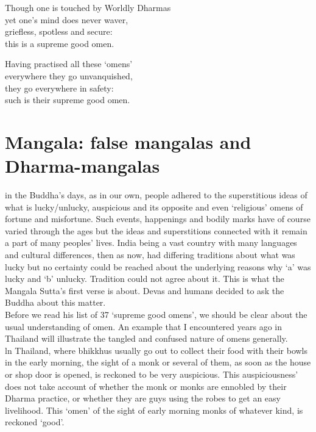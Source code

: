 \begin{MyDescription}{}
Though one is touched by Worldly Dharmas\\
yet one's mind does never waver,\\
grieﬂess, spotless and secure:\\
this is a supreme good omen.
\end{MyDescription}

\begin{MyDescription}{}
Having practised all these `omens'\\
everywhere they go unvanquished,\\
they go everywhere in safety:\\
such is their supreme good omen.
\end{MyDescription}

\begin{MyDescription}[(Sn. 258-269)]{}
\end{MyDescription}
\newpage
\section{Mangala: false mangalas and Dharma-mangalas}
in the Buddha's days, as in our own, people adhered to the superstitious ideas of what is lucky/unlucky, auspicious and its opposite and even `religious' omens of fortune and misfortune. Such events, happenings and bodily marks have of course varied through the ages but the ideas and superstitions connected with it remain a part of many peoples' lives. India being a vast country with many languages and cultural differences, then as now, had differing traditions about what was lucky but no certainty could be reached about the underlying reasons why `a' was lucky and `b' unlucky. Tradition could not agree about it. This is what the Mangala Sutta's ﬁrst verse is about. Devas and humans decided to ask the Buddha about this matter.\\

Before we read his list of 37 `supreme good omens', we should be clear about the usual understanding of omen. An example that I encountered years ago in Thailand will illustrate the tangled and confused nature of omens generally.\\

ln Thailand, where bhikkhus usually go out to collect their food with their bowls in the early morning, the sight of a monk or several of them, as soon as the house or shop door is opened, is reckoned to be very auspicious. This auspiciousness' does not take account of whether the monk or monks are ennobled by their Dharma practice, or whether they are guys using the robes to get an easy livelihood. This `omen' of the sight of early morning monks of whatever kind, is reckoned `good'.\\

